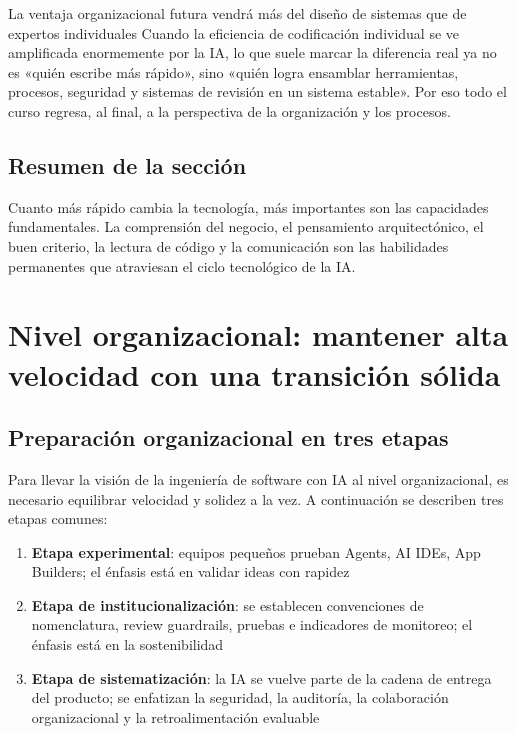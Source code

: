 \documentclass[a4paper]{article}
\begin{document}
\begin{knowledgebox}{La ventaja organizacional futura vendrá más del diseño de sistemas que de expertos individuales}
Cuando la eficiencia de codificación individual se ve amplificada enormemente por la IA, lo que suele marcar la diferencia real ya no es «quién escribe más rápido», sino «quién logra ensamblar herramientas, procesos, seguridad y sistemas de revisión en un sistema estable». Por eso todo el curso regresa, al final, a la perspectiva de la organización y los procesos.
\end{knowledgebox}

\subsection{Resumen de la sección}

Cuanto más rápido cambia la tecnología, más importantes son las capacidades fundamentales. La comprensión del negocio, el pensamiento arquitectónico, el buen criterio, la lectura de código y la comunicación son las habilidades permanentes que atraviesan el ciclo tecnológico de la IA.

\section{Nivel organizacional: mantener alta velocidad con una transición sólida}

\subsection{Preparación organizacional en tres etapas}

Para llevar la visión de la ingeniería de software con IA al nivel organizacional, es necesario equilibrar velocidad y solidez a la vez. A continuación se describen tres etapas comunes:

\begin{enumerate}
    \item \textbf{Etapa experimental}: equipos pequeños prueban Agents, AI IDEs, App Builders; el énfasis está en validar ideas con rapidez
    \item \textbf{Etapa de institucionalización}: se establecen convenciones de nomenclatura, review guardrails, pruebas e indicadores de monitoreo; el énfasis está en la sostenibilidad
    \item \textbf{Etapa de sistematización}: la IA se vuelve parte de la cadena de entrega del producto; se enfatizan la seguridad, la auditoría, la colaboración organizacional y la retroalimentación evaluable
\end{enumerate}
\end{document}
